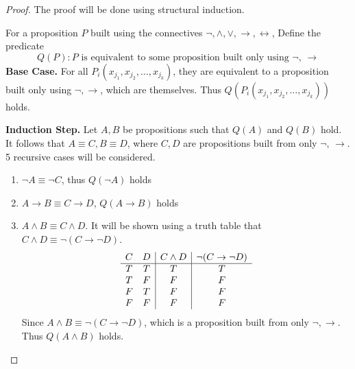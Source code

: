 \documentclass[11pt]{article}
\begin{document}
    \begin{proof}
        The proof will be done using structural induction.

        For a proposition \(P\) built using the connectives $\neg, \wedge, \vee, \rightarrow, \leftrightarrow$, Define the predicate
        \[
            Q(P) : P \text{ is equivalent to some proposition built only using } \neg \text{, } \rightarrow
        \]
        \textbf{Base Case.} For all \(P_i(x_{j_1}, x_{j_2}, \dots, x_{j_k})\), they are equivalent to a proposition built only using \(\neg, \rightarrow\), which are themselves. Thus \(Q(P_i(x_{j_1}, x_{j_2}, \dots, x_{j_k}))\) holds.

        \noindent\textbf{Induction Step.} Let \(A,B\) be propositions such that \(Q(A)\) and \(Q(B)\) hold. It follows that \(A\equiv C, B\equiv D\), where \(C, D\) are propositions built from only \(\neg \text{, } \rightarrow\). 5 recursive cases will be considered.

        \begin{enumerate}
            \item \(\neg A \equiv \neg C\), thus \(Q(\neg A)\) holds
            \item \(A \rightarrow B \equiv C \rightarrow D\), \(Q(A \rightarrow B)\) holds
            \item \(A \land B \equiv C \land D\). It will be shown using a truth table that \(C \land D \equiv \neg(C \rightarrow \neg D)\).
            \begin{displaymath}
                \begin{array}{c c | c | c}
                    C & D & C \land D & \neg(C \rightarrow \neg D)\\
                    \hline
                    T & T & T & T\\
                    T & F & F & F\\
                    F & T & F & F\\
                    F & F & F & F\\
                \end{array}
            \end{displaymath}
            Since \(A \land B \equiv \neg(C \rightarrow \neg D)\), which is a proposition built from only \(\neg, \rightarrow\). Thus \(Q(A \land B)\) holds.


\end{enumerate}
\end{proof}
\end{document}
